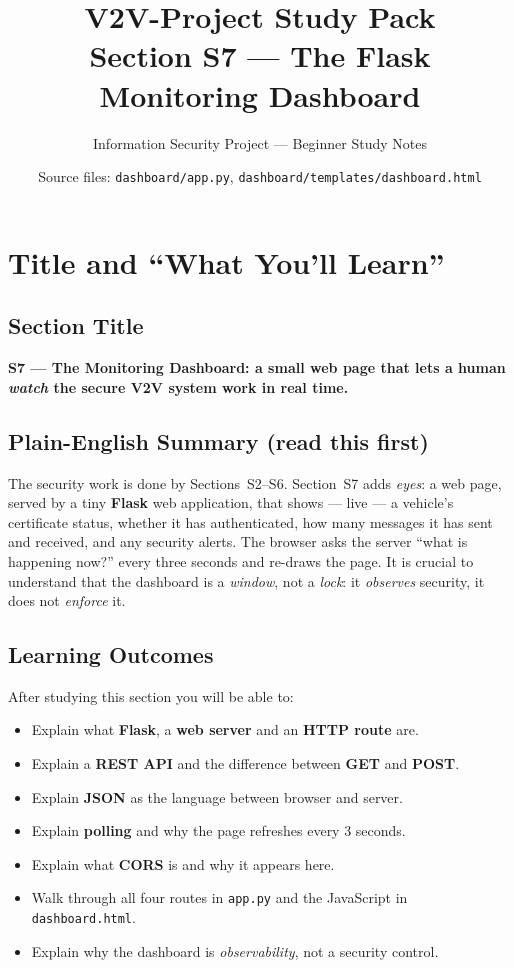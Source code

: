 \documentclass[11pt,a4paper]{article}
\title{\textbf{V2V-Project Study Pack}\\[4pt]
       \large Section S7 --- The Flask Monitoring Dashboard}
\author{Information Security Project --- Beginner Study Notes}
\date{Source files: \texttt{dashboard/app.py}, \texttt{dashboard/templates/dashboard.html}}
\begin{document}
\maketitle
\tableofcontents
\newpage

\section{Title and ``What You'll Learn''}

\subsection*{Section Title}
\textbf{S7 --- The Monitoring Dashboard: a small web page that lets a human
\emph{watch} the secure V2V system work in real time.}

\subsection*{Plain-English Summary (read this first)}
The security work is done by Sections~S2--S6. Section~S7 adds \emph{eyes}: a web
page, served by a tiny \textbf{Flask} web application, that shows --- live --- a
vehicle's certificate status, whether it has authenticated, how many messages it
has sent and received, and any security alerts. The browser asks the server
``what is happening now?'' every three seconds and re-draws the page. It is
crucial to understand that the dashboard is a \emph{window}, not a \emph{lock}:
it \emph{observes} security, it does not \emph{enforce} it.

\subsection*{Learning Outcomes}
After studying this section you will be able to:
\begin{itemize}
  \item Explain what \textbf{Flask}, a \textbf{web server} and an
        \textbf{HTTP route} are.
  \item Explain a \textbf{REST API} and the difference between \textbf{GET} and
        \textbf{POST}.
  \item Explain \textbf{JSON} as the language between browser and server.
  \item Explain \textbf{polling} and why the page refreshes every 3 seconds.
  \item Explain what \textbf{CORS} is and why it appears here.
  \item Walk through all four routes in \texttt{app.py} and the JavaScript in
        \texttt{dashboard.html}.
  \item Explain why the dashboard is \emph{observability}, not a security control.
\end{itemize}
\end{document}
